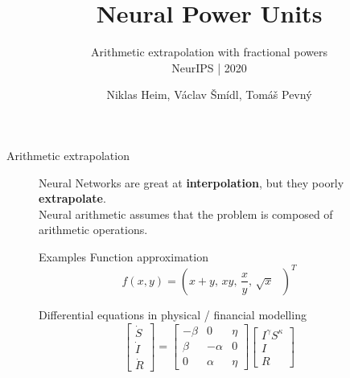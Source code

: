 \documentclass{beamer}
\title{Neural Power Units}
\subtitle{Arithmetic extrapolation with fractional powers\\NeurIPS | 2020}
\author{Niklas Heim, V\'aclav \v Sm\'idl, Tom\'a\v s Pevn\'y}
\date{}
\institute{Artificial Intelligence Center, Czech Technical University\\
  \\
  \url{https://github.com/nmheim/NeuralArithmetic.jl}
}
\begin{document}
\maketitle

\newcommand{\twocols}[2]{
  \begin{figure}
    \begin{minipage}{0.48\textwidth}
      #1
    \end{minipage}
    \hspace{0.01\textwidth}
    \begin{minipage}{0.48\textwidth}
      #2
    \end{minipage}
  \end{figure}  
}

\begin{frame}{Arithmetic extrapolation}
  \twocols{
    \textrightarrow Neural Networks are great at \alert{\bf interpolation}, but they poorly
    \alert{\bf extrapolate}.\\

    \textrightarrow Neural arithmetic assumes that the problem is composed of arithmetic
    operations.
    }{
    \begin{block}{Examples}
      Function approximation
      {\small
      \begin{equation*}
        f(x,y) = (x+y,\, xy,\, \frac{x}{y},\, \sqrt{x} \text{  })^T 
      \end{equation*}}

      Differential equations in physical / financial modelling
      {\tiny
        \renewcommand*{\arraystretch}{1.3}
        \begin{equation*}
          \begin{bmatrix}
            \dot S \\ \dot I \\ \dot R
          \end{bmatrix}
          =
          \begin{bmatrix}
            -\beta & 0 & \eta \\
            \beta & -\alpha & 0 \\
            0 & \alpha & \eta
          \end{bmatrix}
          \begin{bmatrix}
            I^\gamma S^\kappa \\ I \\ R
          \end{bmatrix}
        \end{equation*}
      }



    \end{block}
  }
\end{frame}
\end{document}
